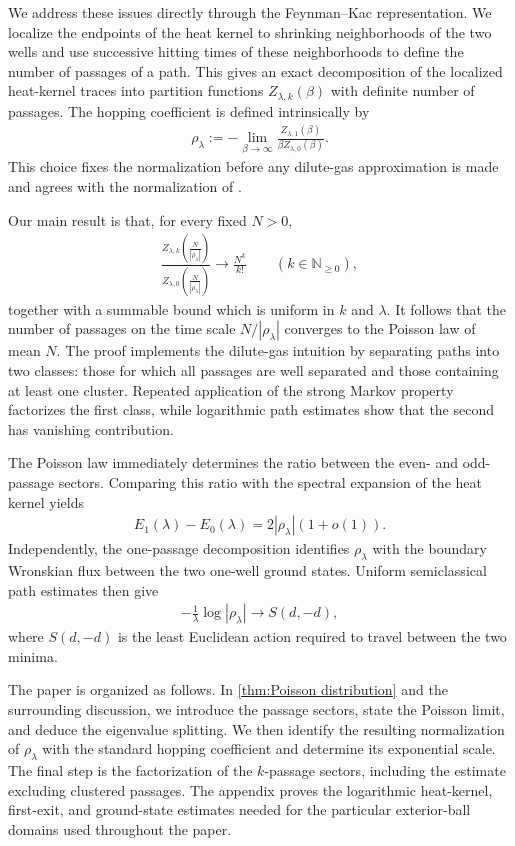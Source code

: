 \documentclass[a4paper,10pt]{article}
\numberwithin{equation}{section}
\theoremstyle{plain}
\theoremstyle{plain}
\theoremstyle{plain}
\theoremstyle{plain}
\theoremstyle{plain}
\theoremstyle{remark}
\theoremstyle{definition}
\newcommand{\NN}{\mathbb{N}}
\newcommand{\abs}[1]{\left\lvert#1\right\rvert}
\newcommand{\eq}[1]{\begin{align*}#1\end{align*}}
\newcommand{\br}[1]{\left(#1\right)}
\begin{document}
We address these issues directly through the Feynman--Kac representation.
We localize the endpoints of the heat kernel to shrinking neighborhoods of
the two wells and use successive hitting times of these neighborhoods to
define the number of passages of a path. This gives an exact decomposition
of the localized heat-kernel traces into partition functions
$Z_{\lambda,k}(\beta)$ with definite number of passages. The hopping coefficient
is defined intrinsically by
\eq{
\rho_\lambda
:=
-\lim_{\beta\to\infty}
\frac{Z_{\lambda,1}(\beta)}
{\beta Z_{\lambda,0}(\beta)}.
}
This choice fixes the normalization before any dilute-gas approximation is
made and agrees with the normalization of \cite{Fefferman2025}.

Our main result is that, for every fixed $N>0$,
\eq{
\frac{
Z_{\lambda,k}\left(\frac{N}{\abs{\rho_\lambda}}\right)
}{
Z_{\lambda,0}\left(\frac{N}{\abs{\rho_\lambda}}\right)
}
\longrightarrow
\frac{N^k}{k!}
\qquad
\left(k\in\NN_{\geq0}\right),
}
together with a summable bound which is uniform in $k$ and
$\lambda$. It follows that the number of passages on the time scale
$N/\abs{\rho_\lambda}$ converges to the Poisson law of mean $N$. The proof
implements the dilute-gas intuition by separating paths into two classes:
those for which all passages are well separated and those containing at
least one cluster. Repeated application of the strong Markov property
factorizes the first class, while logarithmic path estimates show that the
second has vanishing contribution.

The Poisson law immediately determines the ratio between the even- and
odd-passage sectors. Comparing this ratio with the spectral expansion of
the heat kernel yields
\eq{
E_1(\lambda)-E_0(\lambda)
=
2\abs{\rho_\lambda}\br{1+o(1)}.
}
Independently, the one-passage decomposition identifies $\rho_\lambda$ with
the boundary Wronskian flux between the two one-well ground states. Uniform
semiclassical path estimates then give
\eq{
-\frac1\lambda\log\abs{\rho_\lambda}
\longrightarrow
S(d,-d),
}
where $S(d,-d)$ is the least Euclidean action required to travel between
the two minima.

The paper is organized as follows. In \cref{thm:Poisson distribution} and
the surrounding discussion, we introduce the passage sectors, state the
Poisson limit, and deduce the eigenvalue splitting. We then identify the
resulting normalization of $\rho_\lambda$ with the standard hopping
coefficient and determine its exponential scale. The final step is the
factorization of the $k$-passage sectors, including the estimate excluding
clustered passages. The appendix proves the logarithmic heat-kernel,
first-exit, and ground-state estimates needed for the particular
exterior-ball domains used throughout the paper.
\end{document}
